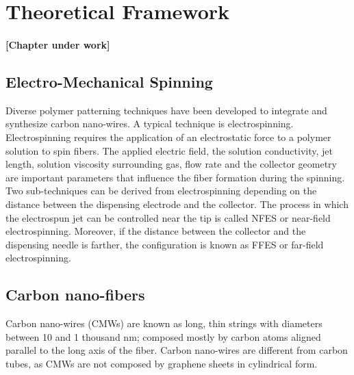 
\chapter{Theoretical Framework} %

\label{Chapter:TheoreticalFramework}

\subsubsection*{\color{mygray}[Chapter under work]}

\section{Electro-Mechanical Spinning}
Diverse polymer patterning techniques have been developed to integrate and synthesize carbon nano-wires. A typical technique is electrospinning. Electrospinning requires the application of an electrostatic force to a polymer solution to spin fibers. The applied electric field, the solution conductivity, jet length, solution viscosity surrounding gas, flow rate and the collector geometry are important parameters that influence the fiber formation during the spinning. \cite{Nataraj2012} Two sub-techniques can be derived from electrospinning depending on the distance between the dispensing electrode and the collector. The process in which the electrospun jet can be controlled near the
tip is called NFES or near-field electrospinning. \cite{Cisquella-Serra2019} Moreover, if the distance between the collector and the dispensing needle is farther, the configuration is known as FFES or far-field electrospinning. \cite{Nataraj2012}

\section{Carbon nano-fibers}
Carbon nano-wires (CMWs) are known as long, thin strings with diameters between 10 and 1 thousand nm; composed mostly by carbon atoms aligned parallel to the long axis of the fiber. \cite{Nataraj2012} Carbon nano-wires are different from carbon tubes, as CMWs are not composed by graphene sheets in cylindrical form. \cite{Nataraj2012}







